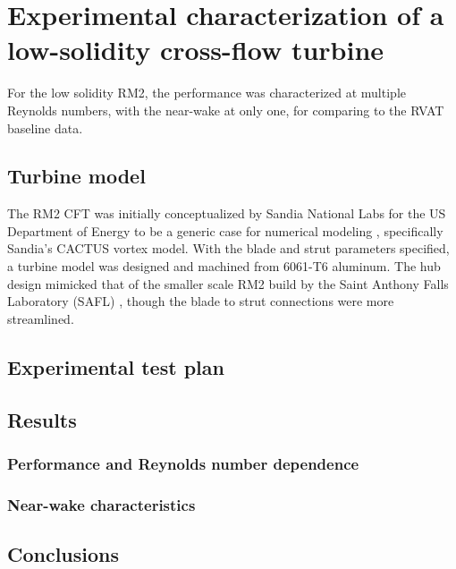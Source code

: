 \chapter{Experimental characterization of a low-solidity cross-flow turbine}

For the low solidity RM2, the performance was characterized at multiple Reynolds
numbers, with the near-wake at only one, for comparing to the RVAT baseline
data.


\section{Turbine model}

The RM2 CFT was initially conceptualized by Sandia National Labs for the US
Department of Energy to be a generic case for numerical modeling
\cite{Barone2011}, specifically Sandia's CACTUS vortex model. With the blade and
strut parameters specified, a turbine model was designed and machined from
6061-T6 aluminum. The hub design mimicked that of the smaller scale RM2 build by
the Saint Anthony Falls Laboratory (SAFL) \cite{Hill2014}, though the blade to
strut connections were more streamlined.


\section{Experimental test plan}


\section{Results}


\subsection{Performance and Reynolds number dependence}


\subsection{Near-wake characteristics}


\section{Conclusions}


